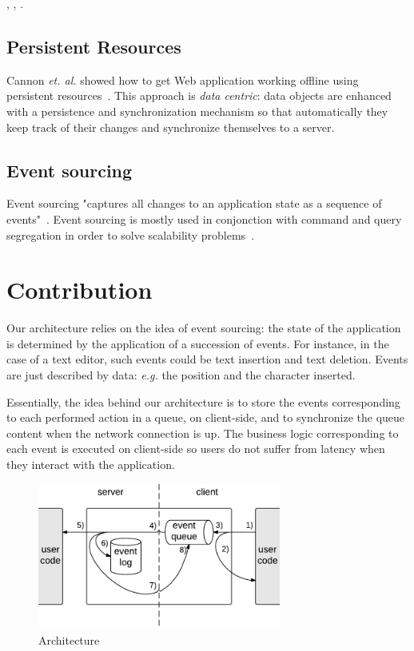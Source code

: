 \documentclass{llncs}
\begin{document}
\cite{Yang2000_OfflineMode}, \cite{Marco11_InterruptionResilience}, \cite{Kao12_WOPRE}.

\subsection{Persistent Resources}

Cannon \emph{et. al.} showed how to get Web application working offline using persistent resources~\cite{Cannon10_Persistence}. This approach is \emph{data centric}: data objects are enhanced with a persistence and synchronization mechanism so that automatically they keep track of their changes and synchronize themselves to a server.

\cite{Benson10_SyncKit}

\subsection{Event sourcing}

Event sourcing "captures all changes to an application state as a sequence of events"~\cite{Fowler05_ES}. Event sourcing is mostly used in conjonction with command and query segregation in order to solve scalability problems~\cite{Betts13_CQRS}.

\section{Contribution}

Our architecture relies on the idea of event sourcing: the state of the application is determined by the application of a succession of events. For instance, in the case of a text editor, such events could be text insertion and text deletion. Events are just described by data: \emph{e.g.} the position and the character inserted.

Essentially, the idea behind our architecture is to store the events corresponding to each performed action in a queue, on client-side, and to synchronize the queue content when the network connection is up. The business logic corresponding to each event is executed on client-side so users do not suffer from latency when they interact with the application.

\begin{figure}
\centering
\includegraphics[width=8cm]{arch.pdf}
\caption{Architecture}
\label{fig-arch}
\end{figure}
\end{document}
